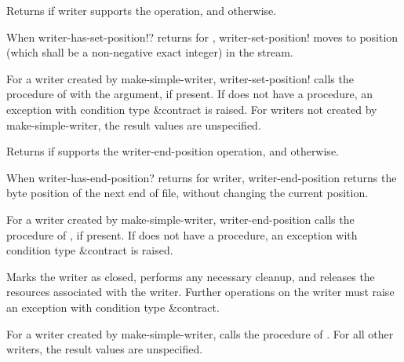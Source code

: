 \begin{entry}{%
}
   
Returns \schtrue{} if writer supports the  operation, and
\schfalse{} otherwise.
\end{entry}

\begin{entry}{%
}
   
When {\cf writer-has-set-position!?} returns \schtrue{} for
, {\cf writer-set-position!}
moves to position  (which shall be a non-negative
exact integer) in the stream.
   
For a writer created by {\cf make-simple-writer}, {\cf writer-set-position!} calls the
  procedure of  with the 
argument, if present. If  does not have a
 procedure, an exception with condition type
{\cf\&contract} is raised.  For writers not created by {\cf
  make-simple-writer}, the result values are unspecified.
\end{entry}

\begin{entry}{%
}
   
Returns \schtrue{} if  supports the {\cf
  writer-end-position} operation, and \schfalse{} otherwise.
\end{entry}

\begin{entry}{%
}
   
When {\cf writer-has-end-position?} returns \schtrue{} for writer,
{\cf writer-end-position}
returns the byte position of the next end of file, without
changing the current position.
   
For a writer created by {\cf make-simple-writer}, 
{\cf writer-end-position} calls the
 procedure of , if present. If 
does not have a  procedure, an exception with condition
type {\cf\&contract} is raised.
\end{entry}

\begin{entry}{%
}
   
Marks the writer as closed, performs any necessary cleanup, and
releases the resources associated with the writer. Further operations
on the writer must raise an exception with condition type
{\cf\&contract}.
   
For a writer created by {\cf make-simple-writer}, calls the
 procedure of .  For all other writers,
the result values are unspecified.
\end{entry}

